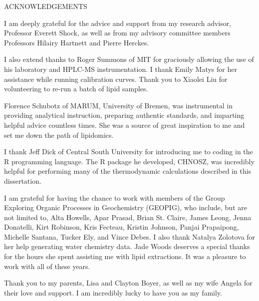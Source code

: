 \begin{center}
    \doublespace
    ACKNOWLEDGEMENTS
\end{center}

I am deeply grateful for the advice and support from my research advisor, Professor Everett Shock, as well as from my advisory committee members Professors Hilairy Hartnett and Pierre Herckes.

I also extend thanks to Roger Summons of MIT for graciously allowing the use of his laboratory and HPLC-MS instrumentation. I thank Emily Matys for her assistance while running calibration curves. Thank you to Xiaolei Liu for volunteering to re-run a batch of lipid samples.

Florence Schubotz of MARUM, University of Bremen, was instrumental in providing analytical instruction, preparing authentic standards, and imparting helpful advice countless times. She was a source of great inspiration to me and set me down the path of lipidomics.

I thank Jeff Dick of Central South University for introducing me to coding in the R programming language. The R package he developed, CHNOSZ, was incredibly helpful for performing many of the thermodynamic calculations described in this dissertation.

I am grateful for having the chance to work with members of the Group Exploring Organic Processes in Geochemistry (GEOPIG), who include, but are not limited to, Alta Howells, Apar Prasad, Brian St. Claire, James Leong, Jenna Donatelli, Kirt Robinson, Kris Fecteau, Kristin Johnson, Panjai Prapaipong, Michelle Santana, Tucker Ely, and Vince Debes. I also thank Natalya Zolotova for her help generating water chemistry data. Jade Woods deserves a special thanks for the hours she spent assisting me with lipid extractions. It was a pleasure to work with all of these years.

Thank you to my parents, Lisa and Clayton Boyer, as well as my wife Angela for their love and support. I am incredibly lucky to have you as my family.







